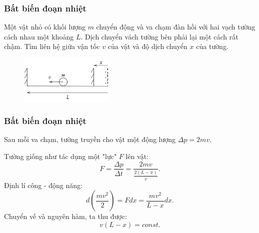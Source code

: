 \begin{frame}
\frametitle{Bất biến đoạn nhiệt}
Một vật nhỏ có khối lượng \(m\) chuyển động và va chạm đàn hồi với hai vạch tường cách nhau một khoảng \(L\). Dịch chuyển vách tường bên phải lại một cách rất chậm. Tìm liên hệ giữa vận tốc \(v\) của vật và độ dịch chuyển \(x\) của tường.
\begin{figure}
    \centering
    \includegraphics[width=0.4\textwidth]{Content/Figure/adiabatic.png}
\end{figure}
\end{frame}

\begin{frame}
\frametitle{Bất biến đoạn nhiệt}
Sau mỗi va chạm, tường truyền cho vật một động lượng \(\Delta p = 2mv\).

Tường giống như tác dụng một "lực" \(F\) lên vật:
\begin{equation*}
    F=\frac{\Delta p}{\Delta t}=\frac{2mv}{\frac{2(L-x)}{v}}.
\end{equation*}
Định lí công - động năng:
\begin{equation*}
    d\left(\frac{mv^2}{2}\right)=F dx=\frac{mv^2}{L-x}dx.
\end{equation*}
Chuyển vế và nguyên hàm, ta thu được:
\begin{equation}
    v(L-x)=const.
\end{equation}
\end{frame}